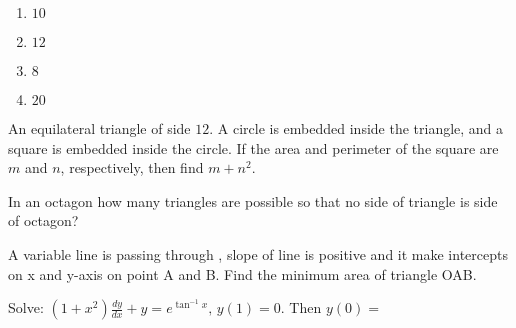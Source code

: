 \begin{enumerate}
    \item $10$
    \item $12$
    \item $8$
    \item $20$
\end{enumerate}
\item An equilateral triangle of side $12$. A circle is embedded inside the triangle, and a square is embedded inside the circle. If the area and perimeter of the square are $m$ and $n$, respectively, then find $m + n^2$.
\item In an octagon how many triangles are possible so that no side of triangle is side of octagon?
\item A variable line is passing through , slope of line is positive and it make intercepts on
x and y-axis on point A and B. Find the minimum area of triangle OAB.
\item Solve: $\left(1 + x^2 \right) \frac{dy}{dx} + y = e^{\tan^{-1}x}, \, y(1) = 0$. Then $y(0) =$
